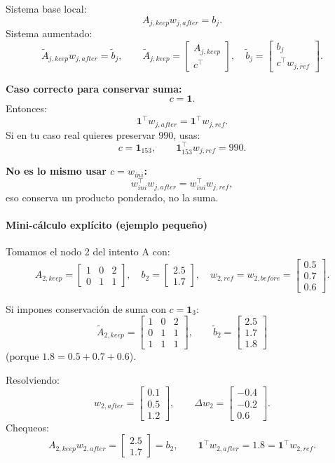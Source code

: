 \documentclass[11pt,a4paper]{article}
\begin{document}
Sistema base local:
\[
A_{j,keep}w_{j,after}=b_j.
\]
Sistema aumentado:
\[
\widetilde A_{j,keep}w_{j,after}=\widetilde b_j,
\qquad
\widetilde A_{j,keep}=
\begin{bmatrix}
A_{j,keep}\\
c^\top
\end{bmatrix},
\quad
\widetilde b_j=
\begin{bmatrix}
b_j\\
c^\top w_{j,ref}
\end{bmatrix}.
\]

\textbf{Caso correcto para conservar suma:}
\[
c=\mathbf 1.
\]
Entonces:
\[
\mathbf 1^\top w_{j,after}=\mathbf 1^\top w_{j,ref}.
\]
Si en tu caso real quieres preservar $990$, usas:
\[
c=\mathbf 1_{153},\qquad
\mathbf 1_{153}^\top w_{j,ref}=990.
\]

\textbf{No es lo mismo usar $c=w_{ini}$:}
\[
w_{ini}^\top w_{j,after}=w_{ini}^\top w_{j,ref},
\]
eso conserva un producto ponderado, no la suma.

\paragraph{Mini-cálculo explícito (ejemplo pequeño)}
Tomamos el nodo 2 del intento A con:
\[
A_{2,keep}=
\begin{bmatrix}
1&0&2\\
0&1&1
\end{bmatrix},\quad
b_2=
\begin{bmatrix}
2.5\\1.7
\end{bmatrix},\quad
w_{2,ref}=w_{2,before}=
\begin{bmatrix}
0.5\\0.7\\0.6
\end{bmatrix}.
\]

Si impones conservación de suma con $c=\mathbf 1_3$:
\[
\widetilde A_{2,keep}=
\begin{bmatrix}
1&0&2\\
0&1&1\\
1&1&1
\end{bmatrix},\qquad
\widetilde b_2=
\begin{bmatrix}
2.5\\1.7\\1.8
\end{bmatrix}
\]
(porque $1.8=0.5+0.7+0.6$).

Resolviendo:
\[
w_{2,after}=
\begin{bmatrix}
0.1\\0.5\\1.2
\end{bmatrix},
\qquad
\Delta w_2=
\begin{bmatrix}
-0.4\\-0.2\\0.6
\end{bmatrix}.
\]
Chequeos:
\[
A_{2,keep}w_{2,after}=
\begin{bmatrix}
2.5\\1.7
\end{bmatrix}=b_2,
\qquad
\mathbf 1^\top w_{2,after}=1.8=\mathbf 1^\top w_{2,ref}.
\]
\end{document}
